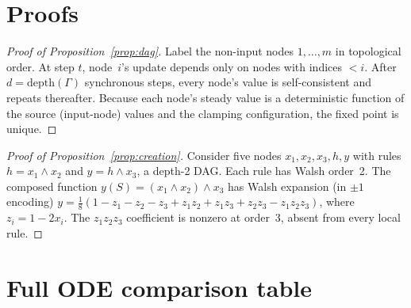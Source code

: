 \documentclass[10pt]{article}
\begin{document}
\section{Proofs}
\label{supp:proofs}

\begin{proof}[Proof of Proposition~\ref{prop:dag}]
Label the non-input nodes $1, \ldots, m$ in topological order. At
step $t$, node~$i$'s update depends only on nodes with indices
$< i$. After $d = \mathrm{depth}(\Gamma)$ synchronous steps, every
node's value is self-consistent and repeats thereafter. Because
each node's steady value is a deterministic function of the source
(input-node) values and the clamping configuration, the fixed point
is unique.
\end{proof}

\begin{proof}[Proof of Proposition~\ref{prop:creation}]
Consider five nodes $x_1, x_2, x_3, h, y$ with rules
$h = x_1 \wedge x_2$ and $y = h \wedge x_3$, a depth-2 DAG. Each
rule has Walsh order~2. The composed function
$y(S) = (x_1 \wedge x_2) \wedge x_3$ has Walsh expansion (in
$\pm 1$ encoding)
$y = \tfrac{1}{8}(1 - z_1 - z_2 - z_3 + z_1 z_2 + z_1 z_3
+ z_2 z_3 - z_1 z_2 z_3)$,
where $z_i = 1 - 2x_i$. The $z_1 z_2 z_3$ coefficient is nonzero
at order~3, absent from every local rule.
\end{proof}


\section{Full ODE comparison table}
\label{supp:ode-table}
\end{document}
